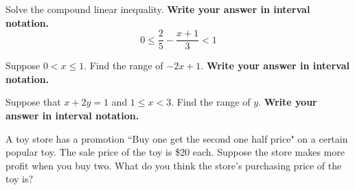 \begin{exercise}
	Solve the compound linear inequality. \textbf{Write your answer in interval notation.}
	\[
		0\le \frac25-\frac{x+1}{3}< 1
	\]	
\end{exercise}

\vfill
\begin{center}\hfill
\end{center}



\begin{exercise}
	Suppose $0< x \le 1$. Find the range of $-2x+1$. \textbf{Write your answer in interval notation.}	
\end{exercise}

\vfill
\begin{center}\hfill
	\raisebox{0.4em}{\rotatebox{\rotationdegree}{
		\parbox{\textwidth}{
				\begin{enumerate*}[label={\theexer~}]
					\item  $[-1, 1)$.
					\hfill\null
				\end{enumerate*}
			}}}
\end{center}

\newpage

\begin{exercise}
	Suppose that $x+2y=1$ and $1\leq x< 3$. Find the range of $y$. \textbf{Write your answer in interval notation.}
\end{exercise}

\vfill
\begin{center}\hfill
	\raisebox{0.4em}{\rotatebox{\rotationdegree}{
		\parbox{\textwidth}{
				\begin{enumerate*}[label={\theexer~}]
					\item  $[0,1)$.
					\hfill\null
				\end{enumerate*}
			}}}
\end{center}

\begin{exercise}
	A toy store has a promotion “Buy one get the second one half price" on a certain popular toy. The sale price of the toy is \$20 each. Suppose the store makes more profit when you buy two. What do you think the store's purchasing price of the toy is?
\end{exercise}

\vfill
\begin{center}\hfill
\end{center}

